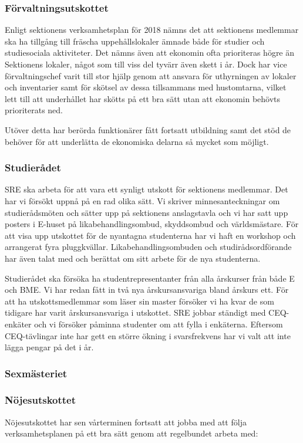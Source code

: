 \documentclass[../_main/handlingar.tex]{subfiles}
\begin{document}
\subsubsection*{Förvaltningsutskottet}
Enligt sektionens verksamhetsplan för 2018 nämns det att sektionens medlemmar ska ha tillgång till fräscha uppehållslokaler ämnade både för studier och studiesociala aktiviteter. Det nämns även att ekonomin ofta prioriteras högre än Sektionens lokaler, något som till viss del tyvärr även skett i år. Dock har vice förvaltningschef varit till stor hjälp genom att ansvara för uthyrningen av lokaler och inventarier samt för skötsel av dessa tillsammans med hustomtarna, vilket lett till att underhållet har skötts på ett bra sätt utan att ekonomin behövts prioriterats ned. 

Utöver detta har berörda funktionärer fått fortsatt utbildning samt det stöd de behöver för att underlätta de ekonomiska delarna så mycket som möjligt. 
\subsubsection*{Studierådet}
SRE ska arbeta för att vara ett synligt utskott för sektionens medlemmar. Det har vi försökt uppnå på en rad olika sätt. Vi skriver minnesanteckningar om studierådsmöten och sätter upp på sektionens anslagstavla och vi har satt upp posters i E-huset på likabehandlingsombud, skyddsombud och världsmästare. För att visa upp utskottet för de nyantagna studenterna har vi haft en workshop och arrangerat fyra pluggkvällar. Likabehandlingsombuden och studirådsordförande har även talat med och berättat om sitt arbete för de nya studenterna. 

Studierådet ska försöka ha studentrepresentanter från alla årskurser från både E och BME. Vi har redan fått in två nya årskursansvariga bland årskurs ett. För att ha utskottsmedlemmar som läser sin master försöker vi ha kvar de som tidigare har varit årskursansvariga i utskottet. SRE jobbar ständigt med CEQ-enkäter och vi försöker påminna studenter om att fylla i enkäterna. Eftersom CEQ-tävlingar inte har gett en större ökning i svarsfrekvens har vi valt att inte lägga pengar på det i år. 
\subsubsection*{Sexmästeriet}

\subsubsection*{Nöjesutskottet}
Nöjesutskottet har sen vårterminen fortsatt att jobba med att följa verksamhetsplanen på ett bra sätt genom att regelbundet arbeta med: 
\end{document}
